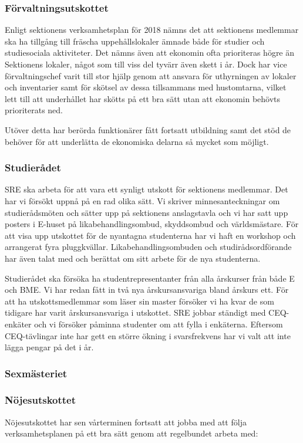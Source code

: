 \documentclass[../_main/handlingar.tex]{subfiles}
\begin{document}
\subsubsection*{Förvaltningsutskottet}
Enligt sektionens verksamhetsplan för 2018 nämns det att sektionens medlemmar ska ha tillgång till fräscha uppehållslokaler ämnade både för studier och studiesociala aktiviteter. Det nämns även att ekonomin ofta prioriteras högre än Sektionens lokaler, något som till viss del tyvärr även skett i år. Dock har vice förvaltningschef varit till stor hjälp genom att ansvara för uthyrningen av lokaler och inventarier samt för skötsel av dessa tillsammans med hustomtarna, vilket lett till att underhållet har skötts på ett bra sätt utan att ekonomin behövts prioriterats ned. 

Utöver detta har berörda funktionärer fått fortsatt utbildning samt det stöd de behöver för att underlätta de ekonomiska delarna så mycket som möjligt. 
\subsubsection*{Studierådet}
SRE ska arbeta för att vara ett synligt utskott för sektionens medlemmar. Det har vi försökt uppnå på en rad olika sätt. Vi skriver minnesanteckningar om studierådsmöten och sätter upp på sektionens anslagstavla och vi har satt upp posters i E-huset på likabehandlingsombud, skyddsombud och världsmästare. För att visa upp utskottet för de nyantagna studenterna har vi haft en workshop och arrangerat fyra pluggkvällar. Likabehandlingsombuden och studirådsordförande har även talat med och berättat om sitt arbete för de nya studenterna. 

Studierådet ska försöka ha studentrepresentanter från alla årskurser från både E och BME. Vi har redan fått in två nya årskursansvariga bland årskurs ett. För att ha utskottsmedlemmar som läser sin master försöker vi ha kvar de som tidigare har varit årskursansvariga i utskottet. SRE jobbar ständigt med CEQ-enkäter och vi försöker påminna studenter om att fylla i enkäterna. Eftersom CEQ-tävlingar inte har gett en större ökning i svarsfrekvens har vi valt att inte lägga pengar på det i år. 
\subsubsection*{Sexmästeriet}

\subsubsection*{Nöjesutskottet}
Nöjesutskottet har sen vårterminen fortsatt att jobba med att följa verksamhetsplanen på ett bra sätt genom att regelbundet arbeta med: 
\end{document}
